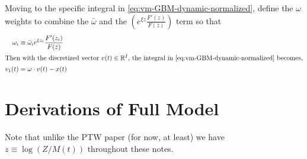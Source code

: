 \documentclass[11pt]{article}
\newcommand{\R}{\ensuremath{\mathbb{R}}}
\begin{document}
Moving to the specific integral in \cref{eq:vm-GBM-dynamic-normalized}, define the $\omega$ weights to combine the $\bar{\omega}$ and the $\left(e^{\xi z} \frac{F'(z)}{F(\bar{z})}\right)$ term so that
\begin{align}
\omega_i &\equiv \bar{\omega}_i e^{\xi z_i}\frac{F'(z_i)}{F(\bar{z})}\\
\intertext{Then with the discretized vector $v(t) \in \R^I$, the integral in \cref{eq:vm-GBM-dynamic-normalized} becomes,}
v_1(t) &= \omega \cdot v(t) - x(t)
\end{align}

\section{Derivations of Full Model}\label{sec:full-model-derivations}
Note that unlike the PTW paper (for now, at least) we have $z \equiv \log(Z/M(t))$ throughout these notes.
\end{document}

